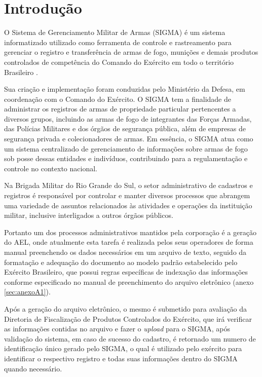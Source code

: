 \chapter{Introdução}

O Sistema de Gerenciamento Militar de Armas (SIGMA) é um sistema informatizado utilizado como ferramenta de controle e rastreamento para gerenciar o registro e transferência de armas de fogo, munições e demais produtos controlados de competência do Comando do Exército em todo o território Brasileiro 
\cite{ExércitoBrasileiro}.

Sua criação e implementação foram conduzidas pelo Ministério da Defesa, em coordenação com o Comando do Exército. O SIGMA tem a finalidade de administrar os registros de armas de propriedade particular pertencentes a diversos grupos, incluindo as armas de fogo de integrantes das Forças Armadas, das Polícias Militares e dos órgãos de segurança pública, além de empresas de segurança privada e colecionadores de armas. Em essência, o SIGMA atua como um sistema centralizado de gerenciamento de informações sobre armas de fogo sob posse dessas entidades e indivíduos, contribuindo para a regulamentação e controle no contexto nacional.
\cite{ExércitoBrasileiro}


Na Brigada Militar do Rio Grande do Sul, o setor administrativo de cadastros e registros é responsável por controlar e manter diversos processos que abrangem uma variedade de assuntos relacionados às atividades e operações da instituição militar, inclusive interligados a outros órgãos públicos. 
\cite{bmDepartamentoAdministrativo}

Portanto um dos processos administrativos mantidos pela corporação é a geração do AEL, onde atualmente esta tarefa é realizada pelos seus operadores de forma manual preenchendo os dados necessários em um arquivo de texto, seguido da formatação e adequação do documento ao modelo padrão estabelecido pelo Exército Brasileiro, que possui regras específicas de indexação das informações conforme especificado no manual de preenchimento do arquivo eletrônico (anexo \ref{sec:anexoA1}). 

Após a geração do arquivo eletrônico, o mesmo é submetido para avaliação da Diretoria de Fiscalização de Produtos Controlados do Exército, que irá verificar as informações contidas no arquivo e fazer o \textit{upload} para o SIGMA, após validação do sistema, em caso de sucesso do cadastro, é retornado um numero de identificação único gerado pelo SIGMA, o qual é utilizado pelo exército para identificar o respectivo registro e todas suas informações dentro do SIGMA quando necessário.\cite{ExércitoBrasileiro} 

